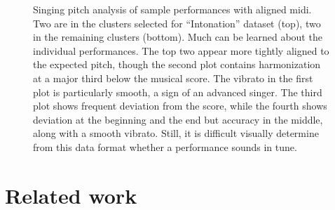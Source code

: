 \begin{figure}[h!]
    \vspace{-0.5in}
    \caption{Singing pitch analysis of sample performances with aligned \gls{midi}. Two are in the clusters selected for  ``Intonation'' dataset (top), two in the remaining clusters (bottom). Much can be learned about the individual performances. The top two appear more tightly aligned to the expected pitch, though the second plot contains harmonization at a major third below the musical score. The vibrato in the first plot is particularly smooth, a sign of an advanced singer. The third plot shows frequent deviation from the score, while the fourth shows deviation at the beginning and the end but accuracy in the middle, along with a smooth vibrato. Still, it is difficult visually determine from this data format whether a performance sounds in tune.}
    \label{fig:sample_intonation}
\end{figure}

\section{Related work}
\label{sec:related}


